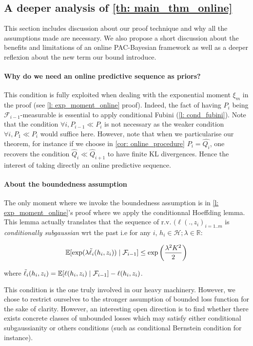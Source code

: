 \begin{noaddcontents}
\subsection{A deeper analysis of \cref{th: main_thm_online}}
\label{sec: deeper_analysis_main_thm}

This section includes discussion about our proof technique and why all the assumptions made are necessary. We also propose a short discussion about the benefits and limitations of an online PAC-Bayesian framework as well as a deeper reflexion about the new term our bound introduce.


\paragraph{Why do we need an online predictive sequence as priors? }

This condition is fully exploited when dealing with the exponential moment $\xi_m$ in the proof (see \cref{l: exp_moment_online} proof). Indeed, the fact of having $P_i$ being $\mathcal{F}_{i-1}$-measurable is essential to apply conditional Fubini (\cref{l: cond_fubini}). Note that the condition $\forall i , P_{i-1}\ll P_{i}$ is not necessary as the weaker condition $\forall i, P_1 \ll P_i$ would suffice here.
However, note that when we particularise our theorem, for instance if we choose in \cref{cor: online_procedure} $P_i= \hat{Q_i}$, one recovers the condition $\hat{Q}_{i}\ll\hat{Q}_{i+1}$ to have finite KL divergences. Hence the interest of taking directly an online predictive sequence.

\paragraph{About the boundedness assumption}

The only moment where we invoke the boundedness assumption is in \cref{l: exp_moment_online}'s proof where we apply the conditionnal Hoeffding lemma. This lemma actually translates that the sequence of r.v. $(\ell(.,z_i)_{i=1..m}$ is \emph{conditionally subgaussian} wrt the past i.e for any $i$, $h_i\in\mathcal{H}; \lambda\in\mathbb{R}$:

\[ \mathbb{E}[\exp(\lambda \Tilde{\ell}_i(h_i,z_i)) \mid \mathcal{F}_{i-1}] \leq \exp\left( \frac{\lambda^2K^2}{2}\right)\]

 where $\Tilde{\ell}_i(h_i,z_i)= \mathbb{E}[\ell(h_i,z_i)\mid \mathcal{F}_{i-1}]-  \ell(h_i,z_i)$.

 This condition is the one truly involved in our heavy machinery. However, we chose to restrict ourselves to the stronger assumption of bounded loss function for the sake of clarity. However, an interesting open direction is to find whether there exists concrete classes of unbounded losses which may satisfy either conditional subgaussianity or others conditions (such as conditional Bernstein condition for instance).



\end{noaddcontents}

